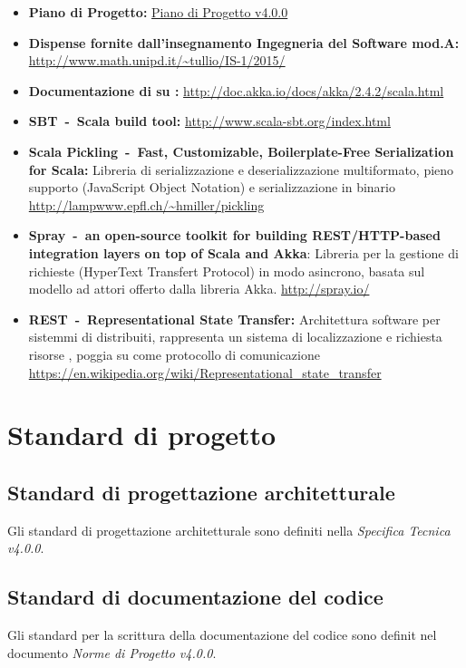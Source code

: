 \documentclass{scalatekids-article}
\begin{document}
\begin{itemize}
\item\textbf{Piano di Progetto:} \href{run:./PianoDiProgetto\_v4.0.0.pdf}{Piano di Progetto v4.0.0}
\item\textbf{Dispense fornite dall'insegnamento Ingegneria del Software mod.A:}\\
  \url{http://www.math.unipd.it/~tullio/IS-1/2015/}
\item\textbf{Documentazione di  su :}
  \url{http://doc.akka.io/docs/akka/2.4.2/scala.html}
\item\textbf{SBT\ -\ Scala build tool:}
  \url{http://www.scala-sbt.org/index.html}
\item\textbf{Scala Pickling\ -\ Fast, Customizable, Boilerplate-Free Serialization for Scala:} Libreria di serializzazione e deserializzazione
  multiformato, pieno supporto  (JavaScript Object Notation) e
  serializzazione in binario \url{http://lampwww.epfl.ch/~hmiller/pickling}
\item\textbf{Spray\ -\ an open-source toolkit for building REST/HTTP-based integration layers on top of Scala and Akka}:
  Libreria per la gestione di richieste (HyperText Transfert Protocol) in modo asincrono, basata sul modello ad
  attori offerto dalla libreria Akka. \url{http://spray.io/}
\item\textbf{REST\ -\ Representational State Transfer:} Architettura software
  per sistemmi di  distribuiti, rappresenta un sistema di
  localizzazione e richiesta risorse , poggia su 
  come protocollo di comunicazione \url{https://en.wikipedia.org/wiki/Representational_state_transfer}
\end{itemize}

\newpage

\section{Standard di progetto}

\subsection{Standard di progettazione architetturale}
Gli standard di progettazione architetturale sono definiti nella
\textit{Specifica Tecnica v4.0.0}.

\subsection{Standard di documentazione del codice}
Gli standard per la scrittura della documentazione del codice sono definit nel
documento \textit{Norme di Progetto v4.0.0}.
\end{document}
